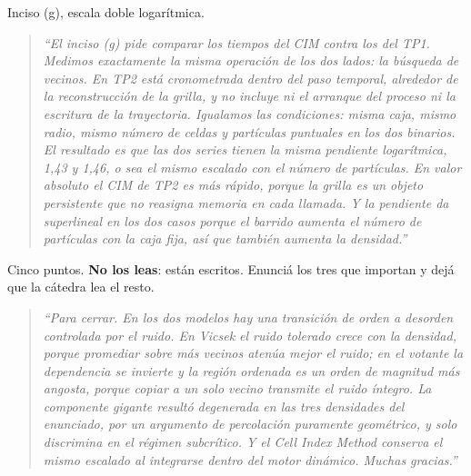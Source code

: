 \documentclass[11pt]{article}
\begin{document}


Inciso (g), escala doble logarítmica.

\begin{quote}
\itshape
``El inciso (g) pide comparar los tiempos del CIM contra los del TP1. Medimos
exactamente la misma operación de los dos lados: la búsqueda de vecinos.
En TP2 está cronometrada dentro del paso temporal, alrededor de la
reconstrucción de la grilla, y no incluye ni el arranque del proceso ni la
escritura de la trayectoria. Igualamos las condiciones: misma caja, mismo radio,
mismo número de celdas y partículas puntuales en los dos binarios. El resultado
es que las dos series tienen la misma pendiente logarítmica, 1,43 y 1,46, o sea
el mismo escalado con el número de partículas. En valor absoluto el CIM de TP2
es más rápido, porque la grilla es un objeto persistente que no reasigna memoria
en cada llamada. Y la pendiente da superlineal en los dos casos porque el
barrido aumenta el número de partículas con la caja fija, así que también
aumenta la densidad.''
\end{quote}



Cinco puntos. \textbf{No los leas}: están escritos. Enunciá los tres que
importan y dejá que la cátedra lea el resto.

\begin{quote}
\itshape
``Para cerrar. En los dos modelos hay una transición de orden a desorden
controlada por el ruido. En Vicsek el ruido tolerado crece con la densidad,
porque promediar sobre más vecinos atenúa mejor el ruido; en el votante la
dependencia se invierte y la región ordenada es un orden de magnitud más
angosta, porque copiar a un solo vecino transmite el ruido íntegro. La
componente gigante resultó degenerada en las tres densidades del enunciado, por
un argumento de percolación puramente geométrico, y solo discrimina en el
régimen subcrítico. Y el Cell Index Method conserva el mismo escalado al
integrarse dentro del motor dinámico. Muchas gracias.''
\end{quote}
\end{document}
